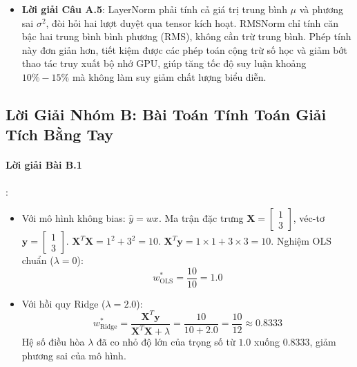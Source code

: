\begin{itemize}
  \item \textbf{Lời giải Câu A.5}:
  LayerNorm phải tính cả giá trị trung bình $\mu$ và phương sai $\sigma^2$, đòi hỏi hai lượt duyệt qua tensor kích hoạt. RMSNorm chỉ tính căn bậc hai trung bình bình phương (RMS), không cần trừ trung bình. Phép tính này đơn giản hơn, tiết kiệm được các phép toán cộng trừ số học và giảm bớt thao tác truy xuất bộ nhớ GPU, giúp tăng tốc độ suy luận khoảng $10\% - 15\%$ mà không làm suy giảm chất lượng biểu diễn.
\end{itemize}

\subsection{Lời Giải Nhóm B: Bài Toán Tính Toán Giải Tích Bằng Tay}

\paragraph{Lời giải Bài B.1}:
\begin{itemize}
  \item[a)] Với mô hình không bias: $\hat{y} = w x$.
  Ma trận đặc trưng $\mathbf{X} = \begin{bmatrix} 1 \\ 3 \end{bmatrix}$, véc-tơ $\mathbf{y} = \begin{bmatrix} 1 \\ 3 \end{bmatrix}$.
  $\mathbf{X}^T \mathbf{X} = 1^2 + 3^2 = 10$. $\mathbf{X}^T \mathbf{y} = 1 \times 1 + 3 \times 3 = 10$.
  Nghiệm OLS chuẩn ($\lambda = 0$):
  \begin{equation*}
  w_{\text{OLS}}^* = \frac{10}{10} = 1.0
  \end{equation*}

  \item[b)] Với hồi quy Ridge ($\lambda = 2.0$):
  \begin{equation*}
  w_{\text{Ridge}}^* = \frac{\mathbf{X}^T \mathbf{y}}{\mathbf{X}^T \mathbf{X} + \lambda} = \frac{10}{10 + 2.0} = \frac{10}{12} \approx 0.8333
  \end{equation*}
  Hệ số điều hòa $\lambda$ đã co nhỏ độ lớn của trọng số từ $1.0$ xuống $0.8333$, giảm phương sai của mô hình.
\end{itemize}

